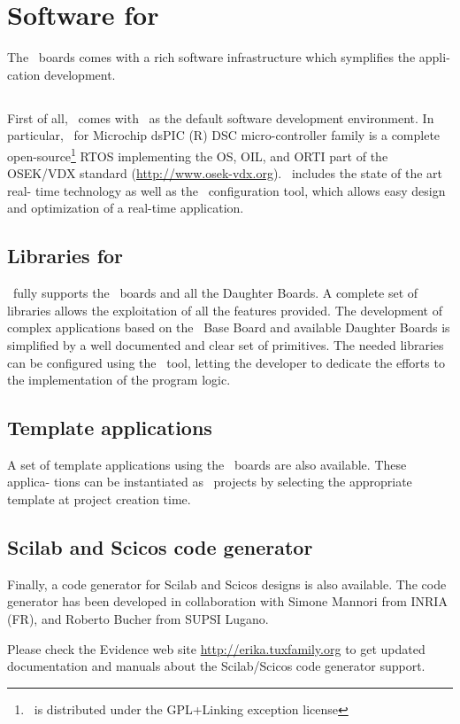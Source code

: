 \chapter{Software for \flex}
\label{ch:software}
The \flex\ boards comes with a rich software infrastructure which symplifies the appli-
cation development.

\section{\ee}
First of all, \flex\ comes with \ee\ as the default software
development environment. In particular, \ee\ for Microchip dsPIC (R)
DSC micro-controller family is a complete open-source\footnote{\ee\ is
distributed under the GPL+Linking exception license} RTOS implementing
the OS, OIL, and ORTI part of the OSEK/VDX standard
(\url{http://www.osek-vdx.org}). \ee\ includes the state of the art
real- time technology as well as the \rtd\ configuration tool, which
allows easy design and optimization of a real-time application.

\section{Libraries for \flex}
\ee\ fully supports the \flex\ boards and all the
Daughter Boards. A complete set of libraries allows the exploitation
of all the features provided. The development of complex applications
based on the \flex\ Base Board and available Daughter Boards is
simplified by a well documented and clear set of primitives.  The
needed libraries can be configured using the \rtd\ tool, letting the
developer to dedicate the efforts to the implementation of the program
logic.

\section{Template applications}
A set of template applications using the \flex\ boards are also
available. These applica- tions can be instantiated as \rtd\ projects
by selecting the appropriate template at project creation time.

\section{Scilab and Scicos code generator}
Finally, a code generator for Scilab and Scicos designs is also
available. The code generator has been developed in collaboration
with Simone Mannori from INRIA (FR), and Roberto Bucher from SUPSI
Lugano. 

Please check the Evidence web site
\url{http://erika.tuxfamily.org} to get updated documentation and
manuals about the Scilab/Scicos code generator support.
